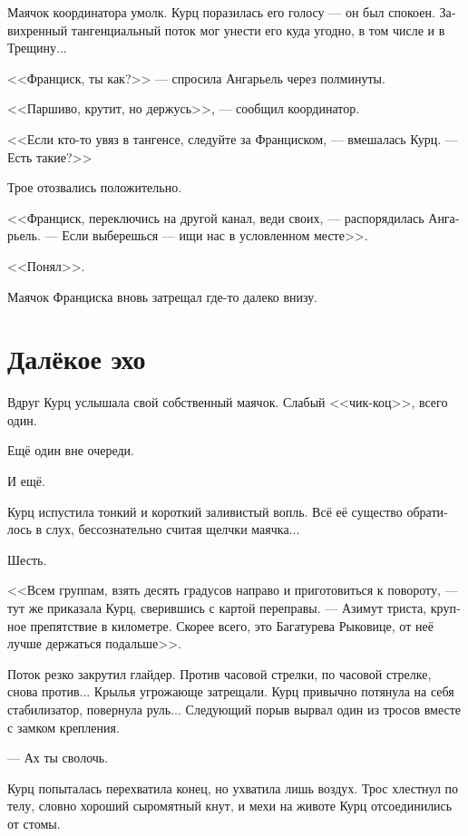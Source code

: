 \documentclass[a4paper,12pt,fleqn]{book}\usepackage{polyglossia}\setdefaultlanguage[babelshorthands=true]{russian}\setotherlanguage{english}\defaultfontfeatures{Ligatures=TeX,Mapping=tex-text}\usepackage{xcolor}\newcommand{\ml}[3]{#2}
\begin{document}
Маячок координатора умолк.
Курц поразилась его голосу --- он был спокоен.
Завихренный тангенциальный поток мог унести его куда угодно, в том числе и в Трещину...

<<Франциск, ты как?>> --- спросила Ангарьель через полминуты.

\ml{$0$}
{<<Паршиво, крутит, но держусь>>, --- сообщил координатор.}
{``Sucks, spinnin' rollin', hang'n here yet,'' the coordinator said.}

\ml{$0$}
{<<Если кто-то увяз в тангенсе, следуйте за Франциском, --- вмешалась Курц.}
{``Anyone stuck in the tangent, follow Franzisk,'' Kurz interrupted.}
--- Есть такие?>>

Трое отозвались положительно.

<<Франциск, переключись на другой канал, веди своих, --- распорядилась Ангарьель.
--- Если выберешься --- ищи нас в условленном месте>>.

\ml{$0$}
{<<Понял>>.}
{``Roger that.''}

Маячок Франциска вновь затрещал где-то далеко внизу.

\section{Далёкое эхо}

Вдруг Курц услышала свой собственный маячок.
Слабый <<чик-коц>>, всего один.

Ещё один вне очереди.

И ещё.

Курц испустила тонкий и короткий заливистый вопль.
Всё её существо обратилось в слух, бессознательно считая щелчки маячка...

Шесть.

<<Всем группам, взять десять градусов направо и приготовиться к повороту, --- тут же приказала Курц, сверившись с картой переправы.
--- Азимут триста, крупное препятствие в километре.
\ml{$0$}
{Скорее всего, это Багатурева Рыковице, от неё лучше держаться подальше>>.}
{Most likely, it's Bagaturewa Rykovitze, better to keep a fair distance.''}

Поток резко закрутил глайдер.
Против часовой стрелки, по часовой стрелке, снова против...
Крылья угрожающе затрещали.
Курц привычно потянула на себя стабилизатор, повернула руль...
Следующий порыв вырвал один из тросов вместе с замком крепления.

--- Ах ты сволочь.

Курц попыталась перехватила конец, но ухватила лишь воздух.
Трос хлестнул по телу, словно хороший сыромятный кнут, и мехи на животе Курц отсоединились от стомы.
\end{document}

